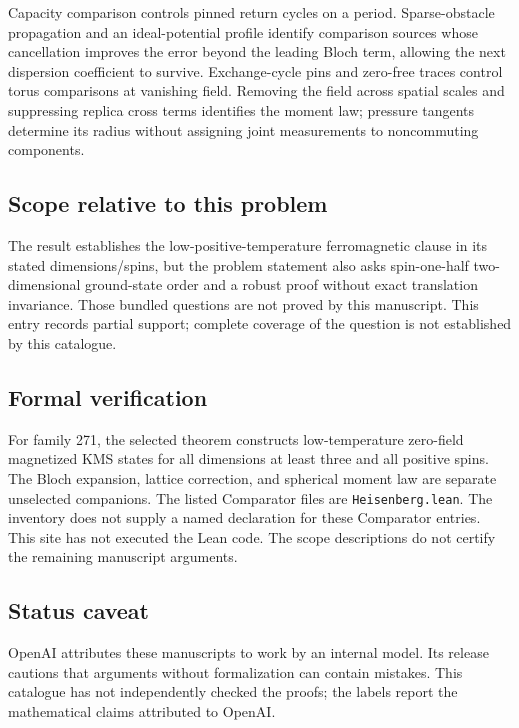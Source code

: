 \documentclass[11pt]{article}
\begin{document}
Capacity comparison controls pinned return cycles on a period. Sparse-obstacle propagation and an ideal-potential profile identify comparison sources whose cancellation improves the error beyond the leading Bloch term, allowing the next dispersion coefficient to survive. Exchange-cycle pins and zero-free traces control torus comparisons at vanishing field. Removing the field across spatial scales and suppressing replica cross terms identifies the moment law; pressure tangents determine its radius without assigning joint measurements to noncommuting components.

\subsection{Scope relative to this problem}
The result establishes the low-positive-temperature ferromagnetic clause in its stated dimensions/spins, but the problem statement also asks spin-one-half two-dimensional ground-state order and a robust proof without exact translation invariance. Those bundled questions are not proved by this manuscript. This entry records partial support; complete coverage of the question is not established by this catalogue.

\subsection{Formal verification}
For family 271, the selected theorem constructs low-temperature zero-field magnetized KMS states for all dimensions at least three and all positive spins. The Bloch expansion, lattice correction, and spherical moment law are separate unselected companions. The listed Comparator files are \texttt{Heisenberg.lean}. The inventory does not supply a named declaration for these Comparator entries. This site has not executed the Lean code. The scope descriptions do not certify the remaining manuscript arguments.

\subsection{Status caveat}
OpenAI attributes these manuscripts to work by an internal model. Its release cautions that arguments without formalization can contain mistakes. This catalogue has not independently checked the proofs; the labels report the mathematical claims attributed to OpenAI.
\end{document}
